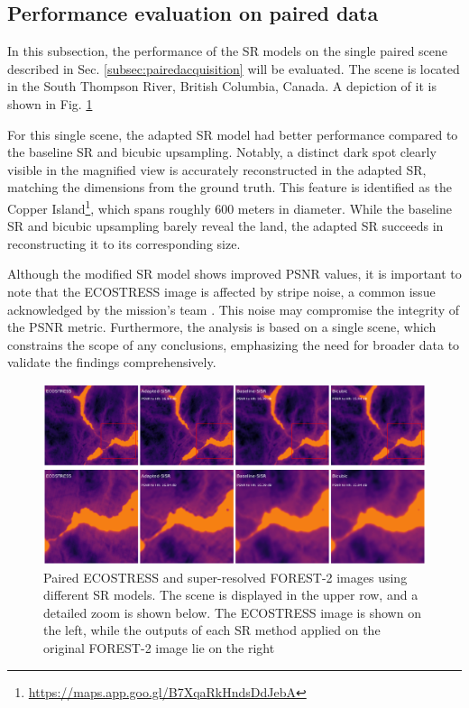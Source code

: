     \subsection{Performance evaluation on paired data}


        In this subsection, the performance of the SR models on the single paired scene described in Sec. \ref{subsec:pairedacquisition} will be evaluated. The scene is located in the South Thompson River, British Columbia, Canada. A depiction of it is shown in Fig. \ref{fig:5-crossover-performance}

        For this single scene, the adapted SR model had better performance compared to the baseline SR and bicubic upsampling. Notably, a distinct dark spot clearly visible in the magnified view is accurately reconstructed in the adapted SR, matching the dimensions from the ground truth. This feature is identified as the Copper Island\footnote{\url{https://maps.app.goo.gl/B7XqaRkHndsDdJebA}}, which spans roughly 600 meters in diameter. While the baseline SR and bicubic upsampling barely reveal the land, the adapted SR succeeds in reconstructing it to its corresponding size.
        
        Although the modified SR model shows improved PSNR values, it is important to note that the ECOSTRESS image is affected by stripe noise, a common issue acknowledged by the mission's team \cite{ecostress2018datafaq}. This noise may compromise the integrity of the PSNR metric. Furthermore, the analysis is based on a single scene, which constrains the scope of any conclusions, emphasizing the need for broader data to validate the findings comprehensively.

    \begin{figure}[H]
        \centering
        \includegraphics[width=\textwidth]{Includes/5-crossover-performance.pdf}
        \caption{Paired ECOSTRESS and super-resolved FOREST-2 images using different SR models. The scene is displayed in the upper row, and a detailed zoom is shown below. The ECOSTRESS image is shown on the left, while the outputs of each SR method applied on the original FOREST-2 image lie on the right}
        \label{fig:5-crossover-performance}
    \end{figure}


